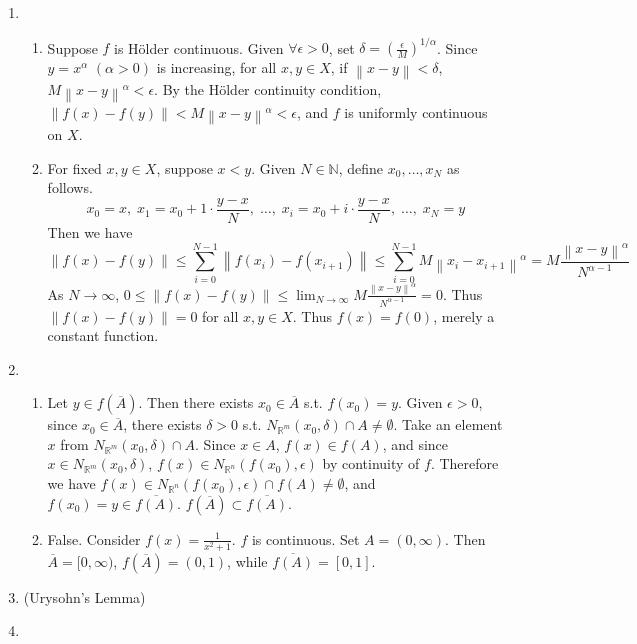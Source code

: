 \documentclass[11pt]{report}
\newcommand{\norm}[1]{\left\lVert#1\right\rVert}
\newcommand{\ra}{\rightarrow}
\newcommand{\ds}{\displaystyle}
\newcommand{\R}{\mathbb{R}}
\newcommand{\N}{\mathbb{N}}
\begin{document}
\begin{enumerate}
\item 
\begin{enumerate}
	\item Suppose $f$ is Hölder continuous. Given $\forall \epsilon > 0$, set $\delta = \left(\frac{\epsilon}{M}\right)^{1/\alpha}$. Since $y = x^\alpha$ $(\alpha > 0)$ is increasing, for all $x, y\in X$, if $\norm{x - y} < \delta$, $M\norm{x - y}^\alpha < \epsilon$. By the Hölder continuity condition, $\norm{f(x) - f(y)} < M\norm{x - y}^\alpha <\epsilon$, and $f$ is uniformly continuous on $X$.
	\item For fixed $x, y\in X$, suppose $x < y$. Given $N\in \N$, define $x_0, \dots, x_N$ as follows. $$x_0 = x,\; x_1 = x_0 +1\cdot \frac{y-x}{N},\; \dots, \;x_i = x_0 + i\cdot \frac{y-x}{N},\; \dots,\; x_N = y$$
	Then we have
	$$\norm{f(x) - f(y)} \leq \sum_{i=0}^{N-1}\norm{f(x_i) - f(x_{i+1})} \leq \sum_{i=0}^{N-1} M\norm{x_i - x_{i+1}}^\alpha = M  \frac{\norm{x- y}^\alpha}{N^{\alpha-1}}$$
	As $N\ra \infty$, $0 \leq \norm{f(x)- f(y)} \ds\leq \lim_{N\ra\infty}  M  \frac{\norm{x- y}^\alpha}{N^{\alpha-1}} = 0$. Thus $\norm{f(x) - f(y)} = 0$ for all $x, y\in X$. Thus $f(x) = f(0)$, merely a constant function.
\end{enumerate}

\item 
\begin{enumerate}
	\item Let $y\in f(\overline{A})$. Then there exists $x_0\in \overline{A}$ s.t. $f(x_0) = y$. Given $\epsilon > 0$, since $x_0\in \overline{A}$, there exists $\delta > 0$ s.t. $N_{\R^m}(x_0, \delta)\cap A \neq \emptyset$. Take an element $x$ from $N_{\R^m}(x_0, \delta) \cap A$. Since $x\in A $, $f(x) \in f(A)$, and since $x\in N_{\R^m}(x_0, \delta) $, $ f(x) \in N_{\R^n}(f(x_0), \epsilon)$ by continuity of $f$. Therefore we have $f(x) \in N_{\R^n}(f(x_0), \epsilon) \cap f(A) \neq \emptyset$, and $f(x_0) = y\in \overline{f(A)}$. $f(\overline{A}) \subset \overline{f(A)}$.
	\item False. Consider $f(x) = \frac{1}{x^2+1}$. $f$ is continuous. Set $A = (0, \infty)$. Then $\overline{A} = [0, \infty)$, $f(\overline{A}) = (0, 1)$, while $\overline{f(A)} = [0, 1]$.
\end{enumerate}

\item (Urysohn's Lemma)

\item 


\end{enumerate}
\end{document}
